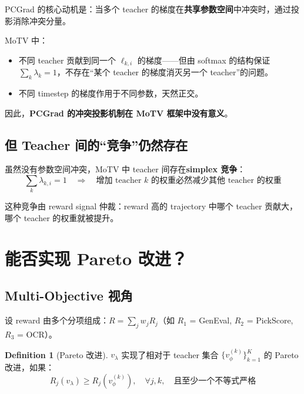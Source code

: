 \documentclass[11pt,a4paper]{article}
\newcommand{\vphi}{v_\phi}
\theoremstyle{definition}
\newtheorem{definition}{Definition}
\begin{document}
PCGrad 的核心动机是：当多个 teacher 的梯度在\textbf{共享参数空间}中冲突时，通过投影消除冲突分量。

MoTV 中：
\begin{itemize}
\item 不同 teacher 贡献到同一个 $\ell_{k,i}$ 的梯度——但由 softmax 的结构保证 $\sum_k \lambda_k = 1$，不存在``某个 teacher 的梯度消灭另一个 teacher''的问题。
\item 不同 timestep 的梯度作用于不同参数，天然正交。
\end{itemize}

因此，\textbf{PCGrad 的冲突投影机制在 MoTV 框架中没有意义}。

\subsection{但 Teacher 间的``竞争''仍然存在}

虽然没有参数空间冲突，MoTV 中 teacher 间存在\textbf{simplex 竞争}：
\begin{equation}
\sum_k \lambda_{k,i} = 1 \quad\Rightarrow\quad \text{增加 teacher $k$ 的权重必然减少其他 teacher 的权重}
\end{equation}

这种竞争由 reward signal 仲裁：reward 高的 trajectory 中哪个 teacher 贡献大，哪个 teacher 的权重就被提升。

\section{能否实现 Pareto 改进？}
\label{sec:pareto}

\subsection{Multi-Objective 视角}

设 reward 由多个分项组成：$R = \sum_j w_j R_j$（如 $R_1$ = GenEval, $R_2$ = PickScore, $R_3$ = OCR）。

\begin{definition}[Pareto 改进]
$v_\lambda$ 实现了相对于 teacher 集合 $\{\vphi^{(k)}\}_{k=1}^K$ 的 Pareto 改进，如果：
\begin{equation}
R_j(v_\lambda) \geq R_j(\vphi^{(k)}), \quad \forall j, k, \quad\text{且至少一个不等式严格}
\end{equation}
\end{definition}
\end{document}

